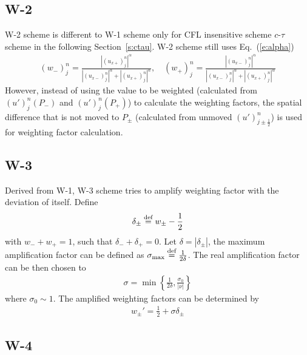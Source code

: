 \documentclass{turgon}
\begin{document}
\subsection{W-2}

W-2 scheme is different to W-1 scheme only for CFL insensitive scheme
$c$-$\tau$ scheme in the following Section~\ref{s:ctau}.  W-2 scheme still uses
Eq.~(\ref{e:alpha})
\begin{align*}
  (w_-)_j^n =
    \frac{|(u_{x+})_j^n|^{\alpha}}
         {|(u_{x-})_j^n|^{\alpha}+|(u_{x+})_j^n|^{\alpha}}, \quad
  (w_+)_j^n =
    \frac{|(u_{x-})_j^n|^{\alpha}}
         {|(u_{x-})_j^n|^{\alpha}+|(u_{x+})_j^n|^{\alpha}}
\end{align*}
However, instead of using the value to be weighted (calculated from
$(u')_j^n(P_-)$ and $(u')_j^n(P_+)$) to calculate the weighting factors, the
spatial difference that is not moved to $P_{\pm}$ (calculated from unmoved
$(u')_{j\pm\frac{1}{2}}^n$) is used for weighting factor calculation.
\cite[See also section 4.2 in][]{chang_multi-dimensional_2003}

\subsection{W-3}

Derived from W-1, W-3 scheme tries to amplify weighting factor with the
deviation of itself.  Define
\begin{align}
  \delta_{\pm} \defeq w_{\pm} - \frac{1}{2} \label{e:W3_delta}
\end{align}
with $w_- + w_+ = 1$, such that $\delta_- + \delta_+ = 0$.  Let $\delta =
|\delta_{\pm}|$, the maximum amplification factor can be defined as
$\sigma_{\text{max}} \defeq \frac{1}{2\delta}$.  The real amplification factor
can be then chosen to
\begin{align}
  \sigma = \min\left\{\frac{1}{2\delta}, \frac{\sigma_0}{|\nu|}\right\}
  \label{e:W3_sigma}
\end{align}
where $\sigma_0\sim1$.  The amplified weighting factors can be determined by
\begin{align}
  w_{\pm}' = \frac{1}{2} + \sigma\delta_{\pm} \label{e:W3_w}
\end{align}
\citep[See also][Eq.~(4.16), (4.30), (4.32), (4.25)]%
{chang_multi-dimensional_2003}

\subsection{W-4}
\end{document}

